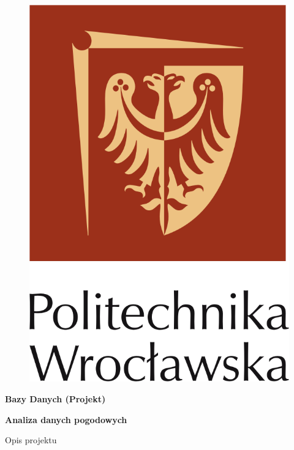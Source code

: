 \documentclass[12pt,a4paper]{article}
\begin{document}
\clearpage
\thispagestyle{empty}
 
\begin{figure}[H]
\centering
\includegraphics[scale=1.3]{logo.png}
\end{figure}
 
\vspace{16pt}
 
\begin{center}
\textbf{\huge Bazy Danych (Projekt)}
 
\vspace{30pt}
 
\textbf{\LARGE Analiza danych pogodowych}
 
 
\vspace{22pt}
 
\LARGE Opis projektu
 
\end{center}
 
\end{document}
